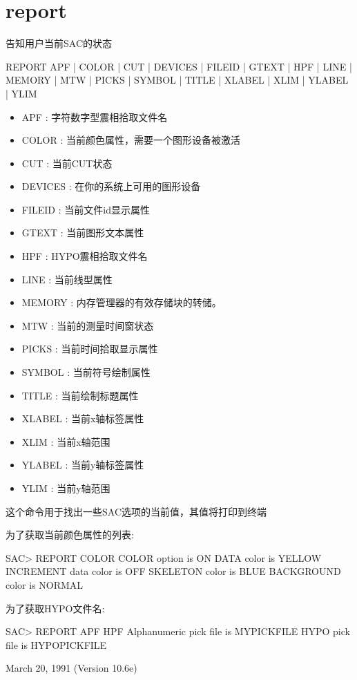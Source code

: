 \section{report}
\label{cmd:report}

告知用户当前SAC的状态

REPORT APF | COLOR | CUT | DEVICES | FILEID | GTEXT | HPF | LINE | MEMORY |  MTW | PICKS | SYMBOL | TITLE | XLABEL | XLIM | YLABEL | YLIM  

\begin{itemize}
\item APF : 字符数字型震相拾取文件名 
\item COLOR : 当前颜色属性，需要一个图形设备被激活 
\item CUT : 当前CUT状态 
\item DEVICES : 在你的系统上可用的图形设备 
\item FILEID : 当前文件id显示属性 
\item GTEXT : 当前图形文本属性 
\item HPF : HYPO震相拾取文件名 
\item LINE : 当前线型属性 
\item MEMORY : 内存管理器的有效存储块的转储。 
\item MTW : 当前的测量时间窗状态 
\item PICKS : 当前时间拾取显示属性 
\item SYMBOL : 当前符号绘制属性 
\item TITLE : 当前绘制标题属性 
\item XLABEL : 当前x轴标签属性 
\item XLIM : 当前x轴范围 
\item YLABEL : 当前y轴标签属性 
\item YLIM : 当前y轴范围 
\end{itemize} 

这个命令用于找出一些SAC选项的当前值，其值将打印到终端

为了获取当前颜色属性的列表:
\begin{SACCode}
SAC> REPORT COLOR
 COLOR option is ON
 DATA color is YELLOW
 INCREMENT data color is OFF
 SKELETON color is BLUE
 BACKGROUND color is NORMAL
\end{SACCode}

为了获取HYPO文件名:
\begin{SACCode}
SAC> REPORT APF HPF
 Alphanumeric pick file is MYPICKFILE
 HYPO pick file is HYPOPICKFILE
\end{SACCode}

March 20, 1991 (Version 10.6e)
